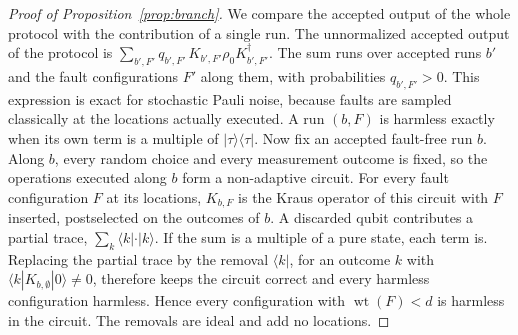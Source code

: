 \documentclass[aps,prl,reprint,twocolumn,amsmath,amssymb,floatfix,nofootinbib,superscriptaddress]{revtex4-2}
\theoremstyle{definition}
\theoremstyle{remark}
\newcommand{\wt}{\operatorname{wt}}
\begin{document}
\begin{proof}[Proof of Proposition~\ref{prop:branch}]
We compare the accepted output of the whole protocol with the contribution of a single run. The unnormalized accepted output of the protocol is $\sum_{b',F'}q_{b',F'}\,K_{b',F'}\rho_0K_{b',F'}^\dagger$. The sum runs over accepted runs $b'$ and the fault configurations $F'$ along them, with probabilities $q_{b',F'}>0$. This expression is exact for stochastic Pauli noise, because faults are sampled classically at the locations actually executed. A run $(b,F)$ is harmless exactly when its own term is a multiple of $|\tau\rangle\langle\tau|$. Now fix an accepted fault-free run $b$. Along $b$, every random choice and every measurement outcome is fixed, so the operations executed along $b$ form a non-adaptive circuit. For every fault configuration $F$ at its locations, $K_{b,F}$ is the Kraus operator of this circuit with $F$ inserted, postselected on the outcomes of $b$. A discarded qubit contributes a partial trace, $\sum_k\langle k|\cdot|k\rangle$. If the sum is a multiple of a pure state, each term is. Replacing the partial trace by the removal $\langle k|$, for an outcome $k$ with $\langle k|K_{b,\emptyset}|0\rangle\neq0$, therefore keeps the circuit correct and every harmless configuration harmless. Hence every configuration with $\wt(F)<d$ is harmless in the circuit. The removals are ideal and add no locations.
\end{proof}
\end{document}
